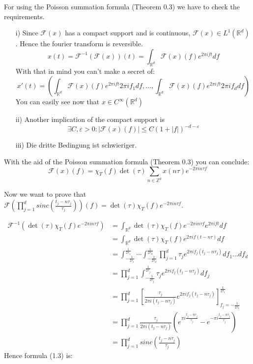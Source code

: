 \documentclass[a4paper, 11pt]{scrreprt}
\newcommand{\RR}{\mathbb{R}}
\newcommand{\ZZ}{\mathbb{Z}}
\newcommand{\FF}{\mathcal{F}}
\begin{document}
For using the Poisson summation formula (Theorem 0.3) we have to check the requirements.

\begin{itemize}
	\item[i)] Since \(\FF(x)\) has a compact support and is continuous, \(\FF(x) \in L^1(\RR^d)\). Hence the fourier transform is reversible.
	 \[x(t) = \FF^{-1}(\FF(x))(t) = \int_{\RR^d}\FF(x)(f) e^{2 \pi i f t} df\]
	 With that in mind you can't make a secret of:
	 \[x'(t) = \left(\int_{\RR^d} \FF(x)(f) e^{2 \pi i f t} 2 \pi i f_1 df, \ldots, \int_{\RR^d} \FF(x)(f) e^{2 \pi i f t} 2 \pi i f_d df \right)\]
	 You can easily see now that \(x \in C^\infty(\RR^d)\)
	 \item[ii)] Another implication of the compact support is \[\exists C,\varepsilon>0: |\FF(x)(f)| \le C (1+|f|)^{-d-\varepsilon}\]
	 \item[iii)] Die dritte Bedingung ist schwieriger.
\end{itemize}

With the aid of the Poisson summation formula (Theorem 0.3) you can conclude:
\begin{equation}
\FF(x)(f) = \chi_{T}(f) \det(\tau) \sum_{n \in \ZZ^d} x(n\tau)e^{-2\pi i n\tau f}
\end{equation}

Now we want to prove that \(\FF\left( \prod_{j=1}^d sinc \left( \frac{t_j-n\tau_j}{\tau_j}\right)\right)(f) = \det(\tau)\chi_{T}(f)e^{-2\pi in\tau f}\).

\begin{align*}
\FF^{-1}\left( \det(\tau) \chi_{T}(f) e^{-2 \pi i n \tau f}\right) 
&= \int_{\RR^d} \det(\tau) \chi_{T}(f) e^{-2 \pi i n \tau f} e^{2 \pi i f t} df \\
&= \int_{\RR^d} \det(\tau) \chi_{T}(f) e^{2 \pi i f (t-n\tau) }df \\
&= \int_{-\frac{1}{2\tau_1}}^{\frac{1}{2\tau_1}} \cdots \int_{-\frac{1}{2\tau_d}}^{\frac{1}{2\tau_d}} \prod_{j=1}^d \tau_j e^{2 \pi i f_j(t_j-n \tau_j)}df_1 \ldots df_d \\
&= \prod_{j=1}^d \int_{-\frac{1}{2\tau_j}}^{\frac{1}{2\tau_j}} \tau_j e^{2 \pi i f_j (t_j - n \tau_j)}df_j \\
&= \prod_{j=1}^d \left[  \frac{\tau_j}{2 \pi i (t_j - n \tau_j)} e^{2 \pi i f_j (t_j - n \tau_j)} \right]_{f_j = -\frac{1}{2\tau_1}}^{\frac{1}{2\tau_1}} \\
&= \prod_{j=1}^d \frac{\tau_j}{2 \pi i (t_j - n \tau_j)} \left( e^{\pi i \frac{t_j - n \tau_j}{\tau_j}} - e^{-\pi i \frac{t_j - n \tau_j}{\tau_j}} \right) \\
&= \prod_{j=1}^d sinc \left( \frac{t_j - n \tau_j}{\tau_j} \right)
\end{align*}
Hence formula (1.3) is:
\end{document}
